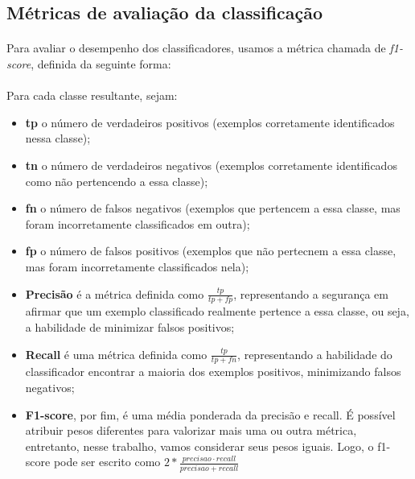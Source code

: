         \subsection{Métricas de avaliação da classificação}
            \paragraph{} Para avaliar o desempenho dos classificadores, usamos a métrica chamada de \textit{f1-score}, definida da seguinte forma:
            
            \paragraph{} Para cada classe resultante, sejam:
                \begin{itemize}
	                \item \textbf{tp} o número de verdadeiros positivos (exemplos corretamente identificados nessa classe);
	                \item \textbf{tn} o número de verdadeiros negativos (exemplos corretamente identificados como não pertencendo a essa classe);
	                \item \textbf{fn} o número de falsos negativos (exemplos que pertencem a essa classe, mas foram incorretamente classificados em outra);
	                \item \textbf{fp} o número de falsos positivos (exemplos que não pertecnem a essa classe, mas foram incorretamente classificados nela);
	                \item \textbf{Precisão} é a métrica definida como $\frac{tp}{tp + fp}$, representando a segurança em afirmar que um exemplo classificado realmente pertence a essa classe, ou seja, a habilidade de minimizar falsos positivos;
	                \item \textbf{Recall} é uma métrica definida como $\frac{tp}{tp + fn}$, representando a habilidade do classificador encontrar a maioria dos exemplos positivos, minimizando falsos negativos;
	                \item \textbf{F1-score}, por fim, é uma média ponderada da precisão e recall. É possível atribuir pesos diferentes para valorizar mais uma ou outra métrica, entretanto, nesse trabalho, vamos considerar seus pesos iguais. Logo, o f1-score pode ser escrito como $2 * \frac{precisao \cdot recall}{precisao + recall} $
                \end{itemize}
                
